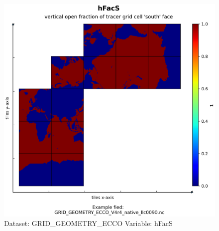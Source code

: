 \begin{figure}[H]
\centering
\includegraphics[scale=0.55]{../images/plots/native_plots_coords/Geometry_Parameters_for_the_Lat-Lon-Cap_90_(llc90)_Native_Model_Grid_(Version_4_Release_4)/hFacS.png}
\caption{Dataset: GRID\_GEOMETRY\_ECCO Variable: hFacS}
\label{tab:table-GRID_GEOMETRY_ECCO_hFacS-Plot}
\end{figure}
\pagebreak
